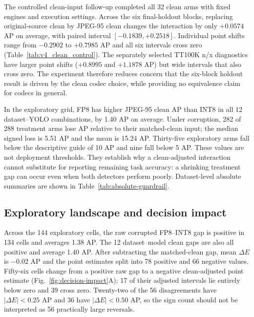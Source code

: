 \documentclass[a4paper,fleqn]{cas-dc}
\newcommand{\AP}{\mathrm{AP}}
\newcommand{\Jclean}{\mathrm{J95}}
\begin{document}
The controlled clean-input follow-up completed all 32 clean arms with fixed engines and execution settings. Across the six final-holdout blocks, replacing original-source clean by JPEG-95 clean changes the interaction by only $+0.0574$ AP on average, with paired interval $[-0.1839,+0.2518]$. Individual point shifts range from $-0.2902$ to $+0.7985$ AP and all six intervals cross zero (Table~\ref{tab:v4_clean_control}). The separately selected TT100K n/x diagnostics have larger point shifts ($+0.8995$ and $+1.1878$ AP) but wide intervals that also cross zero. The experiment therefore reduces concern that the six-block holdout result is driven by the clean codec choice, while providing no equivalence claim for codecs in general.



In the exploratory grid, FP8 has higher JPEG-95 clean AP than INT8 in all 12 dataset--YOLO combinations, by 1.40 AP on average. Under corruption, 282 of 288 treatment arms lose AP relative to their matched-clean input; the median signed loss is 5.51 AP and the mean is 15.24 AP. Thirty-five exploratory arms fall below the descriptive guide of 10 AP and nine fall below 5 AP. These values are not deployment thresholds. They establish why a clean-adjusted interaction cannot substitute for reporting remaining task accuracy: a shrinking treatment gap can occur even when both detectors perform poorly. Dataset-level absolute summaries are shown in Table~\ref{tab:absolute-guardrail}.

\begin{table}[t]
\centering
\caption{Absolute corrupted-accuracy guardrail from the exploratory YOLO ledger. The signed loss is $D=\AP_{\Jclean}-\AP_c$. Rows are balanced descriptive summaries, not deployment thresholds or pooled leaderboard scores.}
\label{tab:absolute-guardrail}
\small
\setlength{\tabcolsep}{4pt}
\renewcommand{\arraystretch}{1.18}

\end{table}

\subsection{Exploratory landscape and decision impact}
\label{sec:decision-impact}
\label{sec:exploratory-results}

Across the 144 exploratory cells, the raw corrupted FP8--INT8 gap is positive in 134 cells and averages 1.38 AP. The 12 dataset--model clean gaps are also all positive and average 1.40 AP. After subtracting the matched-clean gap, mean $\Delta E$ is $-0.02$ AP and the point estimates split into 78 positive and 66 negative values. Fifty-six cells change from a positive raw gap to a negative clean-adjusted point estimate (Fig.~\ref{fig:decision-impact}A); 17 of their adjusted intervals lie entirely below zero and 39 cross zero. Twenty-two of the 56 disagreements have $|\Delta E|<0.25$ AP and 36 have $|\Delta E|<0.50$ AP, so the sign count should not be interpreted as 56 practically large reversals.
\end{document}
